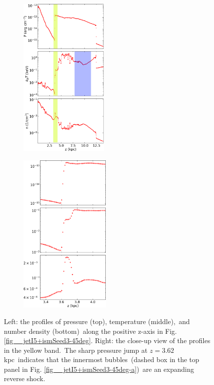 \documentclass[fleqn,usenatbib,useAMS]{mnras}
\begin{document}
 \begin{figure}%
      \begin{subfigure}[t]{0.5\linewidth}%
         \includegraphics[height=8cm]{figures/fig__profile-1.png}%
         \label{fig__profile-1}%
      \end{subfigure}%
      \hspace{4pt}
      \begin{subfigure}[t]{0.5\linewidth}%
         \includegraphics[height=8cm]{figures/fig__profile-2.png}%
         \label{fig__profile-2}%
      \end{subfigure}%
      \caption{
             Left: the profiles of pressure (top), temperature (middle),\
             and number density (bottom)\
             along the positive z-axis in Fig. \ref{fig__jetI5+ismSeed3-45deg}.
             Right: the close-up view of the profiles in the yellow band.\
             The sharp pressure jump at $z=3.62$ kpc\
             indicates that the innermost bubbles\
             (dashed box in the top panel in Fig. \ref{fig__jetI5+ismSeed3-45deg-a})\
             are an expanding reverse shock.
      }%
      \label{fig__profile}%
 \end{figure}%
\end{document}
